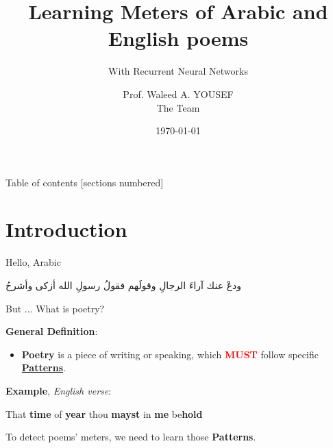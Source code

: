\documentclass[10pt]{beamer}
\title{Learning Meters of Arabic and English poems}
\subtitle{With Recurrent Neural Networks}
\date{\today}
\author{
Prof. Waleed A. YOUSEF \\
The Team}
\institute{Computer Science department\\
Faulty of Computers and Information, Helwan University}
\begin{document}


\maketitle

\begin{frame}{Table of contents}
  [sections numbered]
  \tableofcontents[hideallsubsections]
\end{frame}



\section{Introduction}
\begin{frame}[fragile]{Hello, Arabic}
    \begin{center}
    \begin{Arabic}
    ودعْ عنك آراءَ الرجالِ وقولَهم\hspace{3em}  فقولُ رسولِ الله أزكى وأشرحُ
    \end{Arabic}
    \end{center}
\end{frame}


\begin{frame}[fragile]{But ... What is poetry?}

\textbf{\large General Definition}:
\begin{itemize}
  \item \textbf{Poetry} is a piece of writing or speaking, which
\textbf{\textcolor{red}{MUST}} follow specific
\alert{\underline{\textbf{Patterns}}}.
\end{itemize}

\vspace{0.5cm}
\textbf{\large Example}, \textit{\small English verse}:
\begin{center}
That 
  \textcolor{myGreen2}{\textbf{time}} of 
  \textcolor{myGreen2}{\textbf{year}} thou
  \textcolor{myGreen2}{\textbf{mayst}}  in 
  \textcolor{myGreen2}{\textbf{me}}
be\textcolor{myGreen2}{\textbf{hold}}
\end{center}

To detect poems' meters, we need to learn those \alert{\textbf{Patterns}}.
\end{frame}
\end{document}
